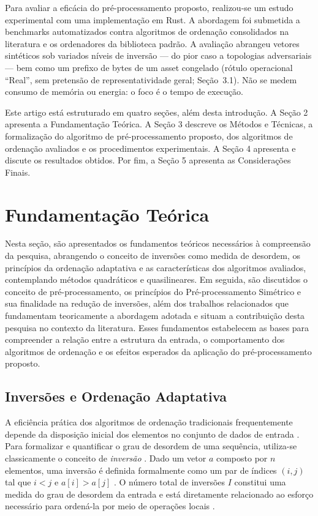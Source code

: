 \documentclass[portuguese]{sbc2025}%
\begin{document}
Para avaliar a eficácia do pré-processamento proposto, realizou-se um estudo experimental com uma implementação em Rust. A abordagem foi submetida a benchmarks automatizados contra algoritmos de ordenação consolidados na literatura e os ordenadores da biblioteca padrão. A avaliação abrangeu vetores sintéticos sob variados níveis de inversão — do pior caso a topologias adversariais — bem como um prefixo de bytes de um asset congelado (rótulo operacional ``Real'', sem pretensão de representatividade geral; Seção~3.1). Não se medem consumo de memória ou energia: o foco é o tempo de execução.

Este artigo está estruturado em quatro seções, além desta introdução. A Seção 2 apresenta a Fundamentação Teórica. A Seção 3 descreve os Métodos e Técnicas, a formalização do algoritmo de pré-processamento proposto, dos algoritmos de ordenação avaliados e os procedimentos experimentais. A Seção 4 apresenta e discute os resultados obtidos. Por fim, a Seção 5 apresenta as Considerações Finais.

\section{Fundamentação Teórica}\label{sec:fund}

Nesta seção, são apresentados os fundamentos teóricos necessários à compreensão da pesquisa, abrangendo o conceito de inversões como medida de desordem, os princípios da ordenação adaptativa e as características dos algoritmos avaliados, contemplando métodos quadráticos e quasilineares. Em seguida, são discutidos o conceito de pré-processamento, os princípios do Pré-processamento Simétrico e sua finalidade na redução de inversões, além dos trabalhos relacionados que fundamentam teoricamente a abordagem adotada e situam a contribuição desta pesquisa no contexto da literatura. Esses fundamentos estabelecem as bases para compreender a relação entre a estrutura da entrada, o comportamento dos algoritmos de ordenação e os efeitos esperados da aplicação do pré-processamento proposto.

\subsection{Inversões e Ordenação Adaptativa}

A eficiência prática dos algoritmos de ordenação tradicionais frequentemente depende da disposição inicial dos elementos no conjunto de dados de entrada \citep{cormen_introduction_2022, estivill-castro_survey_1992}. Para formalizar e quantificar o grau de desordem de uma sequência, utiliza-se classicamente o conceito de \emph{inversão} \citep{knuth_art_1973}. Dado um vetor $a$ composto por $n$ elementos, uma inversão é definida formalmente como um par de índices $(i,j)$ tal que $i < j$ e $a[i] > a[j]$ \citep{knuth_art_1973, sedgewick_algorithms_2011}. O número total de inversões $I$ constitui uma medida do grau de desordem da entrada e está diretamente relacionado ao esforço necessário para ordená-la por meio de operações locais \citep{mannila_measures_1984}.
\end{document}
